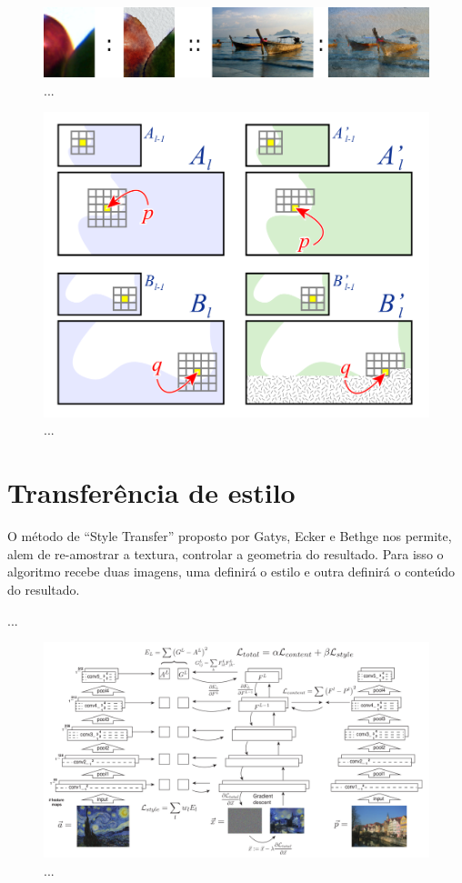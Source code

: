 \begin{figure}[!ht]
	\centering
	\includegraphics[width=\linewidth*2/3]{files/assets/articles/heartzmann1.png}
	\caption{...}
	\label{img:preview}
\end{figure}

\begin{figure}[!ht]
	\centering
	\includegraphics[width=\linewidth*2/3]{files/assets/articles/heartzmann2.png}
	\caption{...}
	\label{img:preview}
\end{figure}


\section{Transferência de estilo} 

O método de ``Style Transfer'' proposto
por Gatys, Ecker e Bethge \cite{Gatys2016}
nos permite, alem de re-amostrar a textura,
controlar a geometria do resultado.
Para isso o algoritmo recebe duas imagens,
uma definirá o estilo
e outra definirá o conteúdo do resultado.

...

\begin{figure}[!ht]
	\centering
	\includegraphics[width=\linewidth]{files/assets/articles/gatys3.png}
	\caption{...}
	\label{img:preview}
\end{figure}




\fi